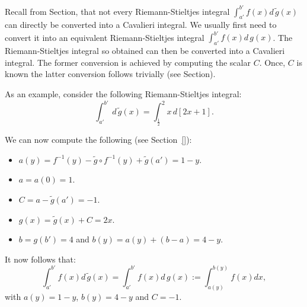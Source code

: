 \documentclass[twoside,reqno,11pt]{fcaa-var} %
\begin{document}
Recall from Section, that not every Riemann-Stieltjes integral $\int_{a'}^{b'} f(x) d\,\widetilde{g}(x)$ can directly be converted into a Cavalieri integral. We usually first need to convert it into an equivalent Riemann-Stieltjes integral $\int_{a'}^{b'} f(x) d\,g(x)$. The Riemann-Stieltjes integral so obtained can then be converted into a Cavalieri integral. The former conversion is achieved by computing the scalar $C$. Once, $C$ is known the latter conversion follows trivially (see Section).

As an example, consider the following Riemann-Stieltjes integral:
\begin{equation}
\int_{a'}^{b'} \,d\,\widetilde{g}(x) = \int_{\frac{1}{2}}^2 x\,d[2x+1].
\end{equation}

We can now compute the following (see Section~\ref{}):
\begin{itemize}
 \item $a(y) = f^{-1}(y) - \widetilde{g}\circ f^{-1}(y)+ \widetilde{g}(a') = 1-y$.
 \item $a = a(0) = 1$.
 \item $C = a - \widetilde{g}(a') = -1$.
 \item $g(x) = \widetilde{g}(x) + C = 2x$.
 \item $b = g(b') = 4$ and $b(y) = a(y) + (b-a) = 4-y$.
\end{itemize}
It now follows that:
\begin{equation}
\int_{a'}^{b'} f(x)d\,\widetilde{g}(x) = \int_{a'}^{b'} f(x)d\,g(x) := \int_{a(y)}^{b(y)} f(x)dx, 
\end{equation}
with $a(y) = 1-y$, $b(y) = 4-y$ and $C=-1$.
\end{document}
